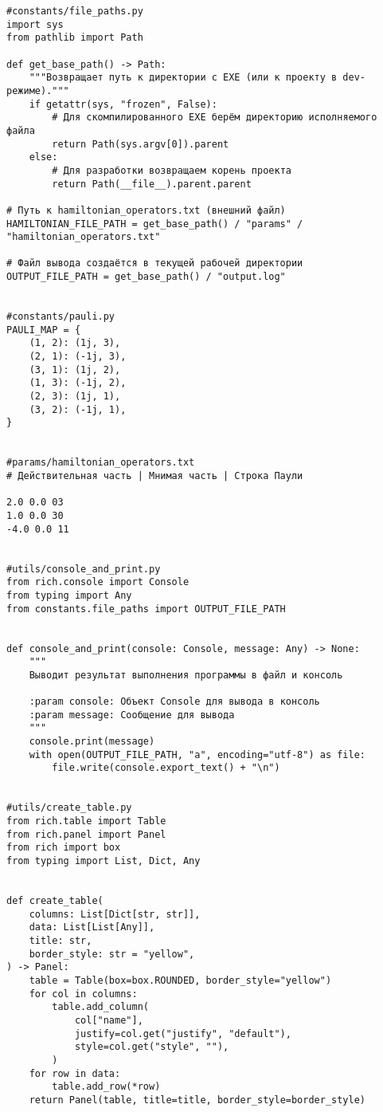 \documentclass[a4paper]{report}
\begin{document}
\begin{lstlisting}
#constants/file_paths.py
import sys
from pathlib import Path

def get_base_path() -> Path:
    """Возвращает путь к директории с EXE (или к проекту в dev-режиме)."""
    if getattr(sys, "frozen", False):
        # Для скомпилированного EXE берём директорию исполняемого файла
        return Path(sys.argv[0]).parent
    else:
        # Для разработки возвращаем корень проекта
        return Path(__file__).parent.parent

# Путь к hamiltonian_operators.txt (внешний файл)
HAMILTONIAN_FILE_PATH = get_base_path() / "params" / "hamiltonian_operators.txt"

# Файл вывода создаётся в текущей рабочей директории
OUTPUT_FILE_PATH = get_base_path() / "output.log"


#constants/pauli.py
PAULI_MAP = {
    (1, 2): (1j, 3),
    (2, 1): (-1j, 3),
    (3, 1): (1j, 2),
    (1, 3): (-1j, 2),
    (2, 3): (1j, 1),
    (3, 2): (-1j, 1),
}


#params/hamiltonian_operators.txt
# Действительная часть | Мнимая часть | Строка Паули

2.0 0.0 03
1.0 0.0 30
-4.0 0.0 11


#utils/console_and_print.py
from rich.console import Console
from typing import Any
from constants.file_paths import OUTPUT_FILE_PATH


def console_and_print(console: Console, message: Any) -> None:
    """
    Выводит результат выполнения программы в файл и консоль

    :param console: Объект Console для вывода в консоль
    :param message: Сообщение для вывода
    """
    console.print(message)
    with open(OUTPUT_FILE_PATH, "a", encoding="utf-8") as file:
        file.write(console.export_text() + "\n")


#utils/create_table.py
from rich.table import Table
from rich.panel import Panel
from rich import box
from typing import List, Dict, Any


def create_table(
    columns: List[Dict[str, str]],
    data: List[List[Any]],
    title: str,
    border_style: str = "yellow",
) -> Panel:
    table = Table(box=box.ROUNDED, border_style="yellow")
    for col in columns:
        table.add_column(
            col["name"],
            justify=col.get("justify", "default"),
            style=col.get("style", ""),
        )
    for row in data:
        table.add_row(*row)
    return Panel(table, title=title, border_style=border_style)



\end{lstlisting}
\end{document}
